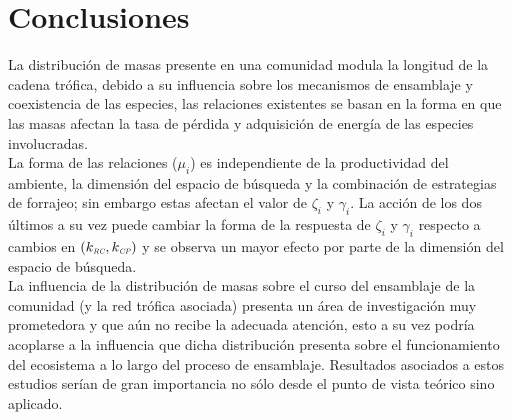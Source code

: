 \section{Conclusiones}

La distribuci\'on de masas presente en una comunidad modula la longitud de la cadena tr\'ofica, debido a su influencia sobre los mecanismos de ensamblaje y coexistencia de las especies, las relaciones existentes se basan en la forma en que las masas afectan la tasa de p\'erdida y adquisici\'on de energ\'ia de las especies involucradas.\\
La forma de las relaciones ($\mu_i$) es independiente de la productividad del ambiente, la dimensi\'on del espacio de b\'usqueda y la combinaci\'on de estrategias de forrajeo; sin embargo estas afectan el valor de $\zeta_i$ y $\gamma_i$. La acci\'on de los dos \'ultimos a su vez puede cambiar la forma de la respuesta de $\zeta_i$ y $\gamma_i$ respecto a cambios en $(k_{\textit{\tiny RC}},k_{\textit{\tiny CP}})$ y se observa un mayor efecto por parte de la dimensi\'on del espacio de b\'usqueda.\\
La influencia de la distribuci\'on de masas sobre el curso del ensamblaje de la comunidad (y la red tr\'ofica asociada) presenta un \'area de investigaci\'on muy prometedora y que a\'un no recibe la adecuada atenci\'on, esto a su vez podr\'ia acoplarse a la influencia que dicha distribuci\'on presenta sobre el funcionamiento del ecosistema a lo largo del proceso de ensamblaje. Resultados asociados a estos estudios ser\'ian de gran importancia no s\'olo desde el punto de vista te\'orico sino aplicado.





